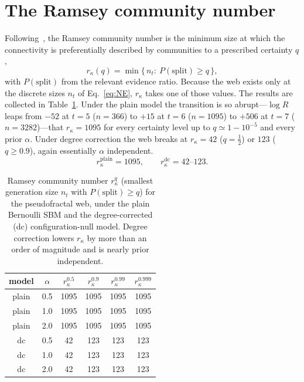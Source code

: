 \documentclass[aps,pre,twocolumn,superscriptaddress,floatfix,nofootinbib]{revtex4-2}
\begin{document}
\section{The Ramsey community number}
\label{sec:kappa}

Following~\cite{vazquez2025ramsey}, the Ramsey community number is the minimum
size at which the connectivity is preferentially described by communities to a
prescribed certainty $q$,
\begin{equation}
r_\kappa(q)=\min\bigl\{\,n_t:\ P(\mathrm{split})\ge q\,\bigr\},
\end{equation}
with $P(\mathrm{split})$ from the relevant evidence ratio. Because the web
exists only at the discrete sizes $n_t$ of Eq.~\eqref{eq:NE}, $r_\kappa$ takes
one of those values. The results are collected in Table~\ref{tab:kappa}. Under
the plain model the transition is so abrupt---$\log R$ leaps from $-52$ at
$t=5$ ($n=366$) to $+15$ at $t=6$ ($n=1095$) to $+506$ at $t=7$ ($n=3282$)---that $r_\kappa=1095$ for every
certainty level up to $q\simeq 1-10^{-5}$ and every prior $\alpha$. Under degree correction the web
breaks at $r_\kappa=42$ ($q=\tfrac12$) or $123$ ($q\ge 0.9$), again essentially
$\alpha$ independent.
\begin{equation}
r_\kappa^{\mathrm{plain}}=1095,\qquad
r_\kappa^{\mathrm{dc}}=42\text{--}123 .
\end{equation}

\begin{table}[t]
\centering
\begin{ruledtabular}
\begin{tabular}{c c c c c c}
model & $\alpha$ & $r_\kappa^{0.5}$ & $r_\kappa^{0.9}$
& $r_\kappa^{0.99}$ & $r_\kappa^{0.999}$\\
\hline
plain & 0.5 & 1095 & 1095 & 1095 & 1095\\
plain & 1.0 & 1095 & 1095 & 1095 & 1095\\
plain & 2.0 & 1095 & 1095 & 1095 & 1095\\
\hline
dc & 0.5 & 42 & 123 & 123 & 123\\
dc & 1.0 & 42 & 123 & 123 & 123\\
dc & 2.0 & 42 & 123 & 123 & 123\\
\end{tabular}
\end{ruledtabular}
\caption{Ramsey community number $r_\kappa^{q}$ (smallest generation size $n_t$
with $P(\mathrm{split})\ge q$) for the pseudofractal web, under the plain
Bernoulli SBM and the degree-corrected (dc) configuration-null model. Degree
correction lowers $r_\kappa$ by more than an order of magnitude and is nearly
prior independent.}
\label{tab:kappa}
\end{table}
\end{document}

